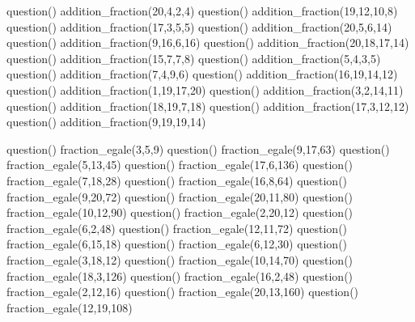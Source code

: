 \documentclass["../Cours.tex"]{subfiles}
\begin{document}
\clearpage
\EXERCICES

\begin{questions}

    \vspace{-1.5em}
        \begin{multicols}{3}\small
        \begin{luacode}
            question() addition_fraction(20,4,2,4)
            question() addition_fraction(19,12,10,8)
            question() addition_fraction(17,3,5,5)
            question() addition_fraction(20,5,6,14)
            question() addition_fraction(9,16,6,16)
            question() addition_fraction(20,18,17,14)
            question() addition_fraction(15,7,7,8)
            question() addition_fraction(5,4,3,5)
            question() addition_fraction(7,4,9,6)
            question() addition_fraction(16,19,14,12)
            question() addition_fraction(1,19,17,20)
            question() addition_fraction(3,2,14,11)
            question() addition_fraction(18,19,7,18)
            question() addition_fraction(17,3,12,12)
            question() addition_fraction(9,19,19,14)
        \end{luacode}
        \end{multicols}
    
    \vspace{-1.5em}
        \begin{multicols}{3}\small
        \begin{luacode}
            question() fraction_egale(3,5,9)
            question() fraction_egale(9,17,63)
            question() fraction_egale(5,13,45)
            question() fraction_egale(17,6,136)
            question() fraction_egale(7,18,28)
            question() fraction_egale(16,8,64)
            question() fraction_egale(9,20,72)
            question() fraction_egale(20,11,80)
            question() fraction_egale(10,12,90)
            question() fraction_egale(2,20,12)
            question() fraction_egale(6,2,48)
            question() fraction_egale(12,11,72)
            question() fraction_egale(6,15,18)
            question() fraction_egale(6,12,30)
            question() fraction_egale(3,18,12)
            question() fraction_egale(10,14,70)
            question() fraction_egale(18,3,126)
            question() fraction_egale(16,2,48)
            question() fraction_egale(2,12,16)
            question() fraction_egale(20,13,160)
            question() fraction_egale(12,19,108)
        \end{luacode}
        \end{multicols}


\end{questions}
\end{document}
